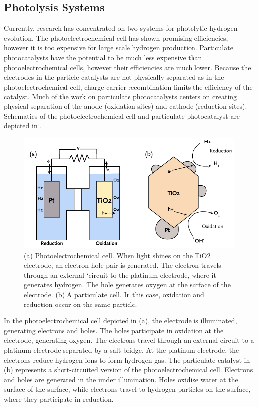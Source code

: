\subsection{Photolysis Systems}
\label{subsec:background.systems}

Currently, research has concentrated on two systems for photolytic hydrogen evolution. The
photoelectrochemical cell has shown promising
efficiencies,\cite{Fujishima:1972hc,User:2001tg} however it is too expensive for large
scale hydrogen production. Particulate photocatalysts have the potential to be much less
expensive than photoelectrochemical cells, however their efficiencies are much lower.
\cite{Kaneko:2002vh} Because the electrodes in the particle catalysts are not physically
separated as in the photoelectrochemical cell, charge carrier recombination limits the
efficiency of the catalyst. Much of the work on particulate photocatalysts centers on
creating physical separation of the anode (oxidation sites) and cathode (reduction
sites).\cite{Kitano:2008io,Kudo:2008fk} Schematics of the photoelectrochemical cell and
particulate photocatalyst are depicted in .

\begin{figure}
	\includegraphics[width=\textwidth]{pecparticle.pdf}
	\caption[Photoelectrochemical and particulate cells]{%
		(a) Photoelectrochemical cell. When light shines on the TiO2 
		electrode, an electron-hole pair is generated. The electron 
		travels through an external `circuit to the platinum electrode, 
		where it generates hydrogen. The hole generates oxygen at the 
		surface of the  electrode. (b) A particulate cell. 
		In this case, oxidation and reduction occur on the same particle.}
	\label{fig:pecparticle}
\end{figure}

In the photoelectrochemical cell depicted in (a), the 
electrode is illuminated, generating electrons and holes. The holes participate in
oxidation at the  electrode, generating oxygen. The electrons travel through an
external circuit to a platinum electrode separated by a salt bridge. At the platinum
electrode, the electrons reduce hydrogen ions to form hydrogen gas. The particulate
catalyst in (b) represents a short-circuited version of the
photoelectrochemical cell. Electrons and holes are generated in the  under
illumination. Holes oxidize water at the surface of the  surface, while electrons
travel to hydrogen particles on the surface, where they participate in reduction.


